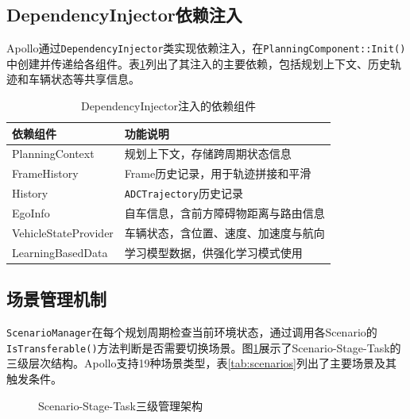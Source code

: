 \subsection{DependencyInjector依赖注入}

Apollo通过\texttt{DependencyInjector}类实现依赖注入，在\texttt{PlanningComponent::Init()}中创建并传递给各组件。表\ref{tab:dependency_injector}列出了其注入的主要依赖，包括规划上下文、历史轨迹和车辆状态等共享信息。

\begin{table}[htbp]
\centering
\caption{DependencyInjector注入的依赖组件}
\label{tab:dependency_injector}
\begin{tabular}{ll}
\toprule
依赖组件 & \textbf{功能说明} \\
\midrule
PlanningContext & 规划上下文，存储跨周期状态信息 \\
FrameHistory & Frame历史记录，用于轨迹拼接和平滑 \\
History & \texttt{ADCTrajectory}历史记录 \\
EgoInfo & 自车信息，含前方障碍物距离与路由信息 \\
VehicleStateProvider & 车辆状态，含位置、速度、加速度与航向 \\
LearningBasedData & 学习模型数据，供强化学习模式使用 \\
\bottomrule
\end{tabular}
\end{table}

\subsection{场景管理机制}

\texttt{ScenarioManager}在每个规划周期检查当前环境状态，通过调用各Scenario的\texttt{IsTransferable()}方法判断是否需要切换场景。图\ref{fig:scenario_hierarchy}展示了Scenario-Stage-Task的三级层次结构。Apollo支持19种场景类型，表\ref{tab:scenarios}列出了主要场景及其触发条件。

\begin{figure}[htbp]
\centering
{}
\caption{Scenario-Stage-Task三级管理架构}
\label{fig:scenario_hierarchy}
\end{figure}


